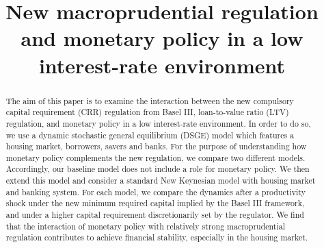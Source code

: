 \documentclass[final,3p,times,twocolumn]{elsarticle}
\begin{document}
\begin{frontmatter}


\title{\huge{New macroprudential regulation and monetary policy in a low interest-rate environment}}






\begin{abstract}
The aim of this paper is to examine the interaction between the new compulsory capital requirement (CRR) regulation from Basel III, loan-to-value ratio (LTV) regulation, and monetary policy in a low interest-rate environment. In order to do so, we use a dynamic stochastic general equilibrium (DSGE) model which features a housing market, borrowers, savers and banks. For the purpose of understanding how monetary policy complements the new regulation, we compare two different models. Accordingly, our baseline model does not include a role for monetary policy. We then extend this model and consider a standard New Keynesian model with housing market and banking system. For each model, we compare the dynamics after a productivity shock under the new minimum required capital implied by the Basel III framework, and under a higher capital requirement discretionarily set by the regulator. We find that the interaction of monetary policy with relatively strong macroprudential regulation contributes to achieve financial stability, especially in the housing market.



\end{abstract}
\end{frontmatter}
\end{document}
